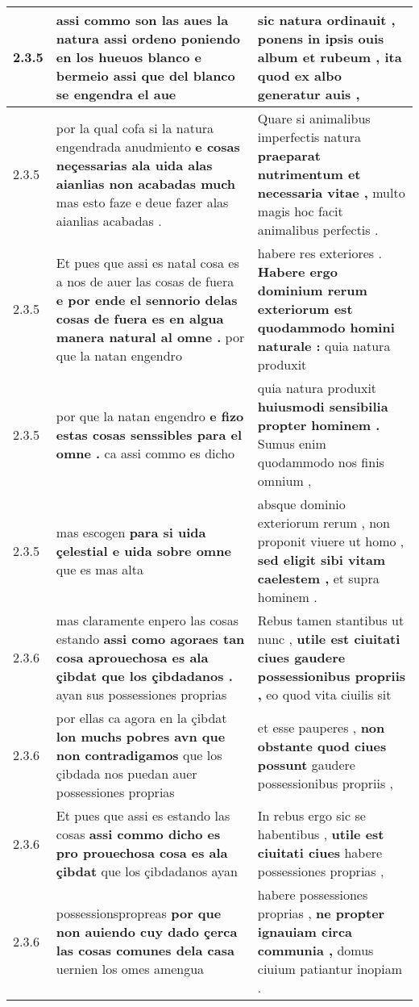 \begin{tabular}{|p{1cm}|p{6.5cm}|p{6.5cm}|}
2.3.5 & assi commo son las aues la natura \textbf{ assi ordeno poniendo en los hueuos blanco e bermeio } assi que del blanco se engendra el aue & sic natura ordinauit , \textbf{ ponens in ipsis ouis album et rubeum , } ita quod ex albo generatur auis , \\\hline
2.3.5 & por la qual cofa si la natura engendrada anudmiento \textbf{ e cosas neçessarias ala uida alas aianlias non acabadas much } mas esto faze e deue fazer alas aianlias acabadas . & Quare si animalibus imperfectis natura \textbf{ praeparat nutrimentum et necessaria vitae , } multo magis hoc facit animalibus perfectis . \\\hline
2.3.5 & Et pues que assi es natal cosa es a nos de auer las cosas de fuera \textbf{ e por ende el sennorio delas cosas de fuera es en algua manera natural al omne . } por que la natan engendro & habere res exteriores . \textbf{ Habere ergo dominium rerum exteriorum est quodammodo homini naturale : } quia natura produxit \\\hline
2.3.5 & por que la natan engendro \textbf{ e fizo estas cosas senssibles para el omne . } ca assi commo es dicho & quia natura produxit \textbf{ huiusmodi sensibilia propter hominem . } Sumus enim quodammodo nos finis omnium , \\\hline
2.3.5 & mas escogen \textbf{ para si uida çelestial e uida sobre omne } que es mas alta & absque dominio exteriorum rerum , non proponit viuere ut homo , \textbf{ sed eligit sibi vitam caelestem , } et supra hominem . \\\hline
2.3.6 & mas claramente enpero las cosas estando \textbf{ assi como agoraes tan cosa aprouechosa es ala çibdat que los çibdadanos . } ayan sus possessiones proprias & Rebus tamen stantibus ut nunc , \textbf{ utile est ciuitati ciues gaudere possessionibus propriis , } eo quod vita ciuilis sit \\\hline
2.3.6 & por ellas ca agora en la çibdat \textbf{ lon muchs pobres avn que non contradigamos } que los çibdada nos puedan auer possessiones proprias & et esse pauperes , \textbf{ non obstante quod ciues possunt } gaudere possessionibus propriis , \\\hline
2.3.6 & Et pues que assi es estando las cosas \textbf{ assi commo dicho es pro prouechosa cosa es ala çibdat } que los çibdadanos ayan & In rebus ergo sic se habentibus , \textbf{ utile est ciuitati ciues } habere possessiones proprias , \\\hline
2.3.6 & possessionspropreas \textbf{ por que non auiendo cuy dado çerca las cosas comunes dela casa } uernien los omes amengua & habere possessiones proprias , \textbf{ ne propter ignauiam circa communia , } domus ciuium patiantur inopiam . \\\hline

\end{tabular}
